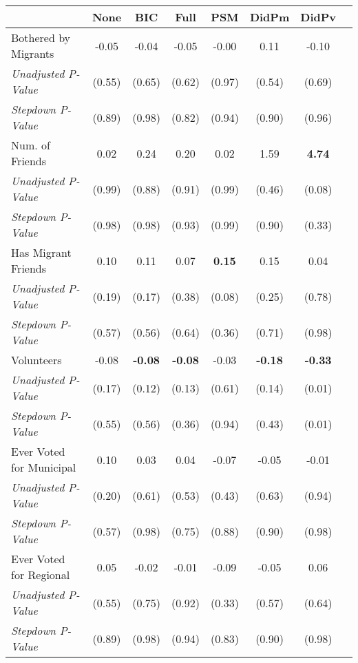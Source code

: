 \begin{tabular}{l c c c c c c c}
\toprule
 & None & BIC & Full & PSM & DidPm & DidPv \\
\midrule
Bothered by Migrants & -0.05 & -0.04 & -0.05 & -0.00 & 0.11 & -0.10 \\
\quad \textit{Unadjusted P-Value} & (0.55) & (0.65) & (0.62) & (0.97) & (0.54) & (0.69) \\
\quad \textit{Stepdown P-Value} & (0.89) & (0.98) & (0.82) & (0.94) & (0.90) & (0.96) \\
Num. of Friends & 0.02 & 0.24 & 0.20 & 0.02 & 1.59 & \textbf{ 4.74 } \\
\quad \textit{Unadjusted P-Value} & (0.99) & (0.88) & (0.91) & (0.99) & (0.46) & (0.08) \\
\quad \textit{Stepdown P-Value} & (0.98) & (0.98) & (0.93) & (0.99) & (0.90) & (0.33) \\
Has Migrant Friends & 0.10 & 0.11 & 0.07 & \textbf{ 0.15 } & 0.15 & 0.04 \\
\quad \textit{Unadjusted P-Value} & (0.19) & (0.17) & (0.38) & (0.08) & (0.25) & (0.78) \\
\quad \textit{Stepdown P-Value} & (0.57) & (0.56) & (0.64) & (0.36) & (0.71) & (0.98) \\
Volunteers & -0.08 & \textbf{ -0.08 } & \textbf{ -0.08 } & -0.03 & \textbf{ -0.18 } & \textbf{ -0.33 } \\
\quad \textit{Unadjusted P-Value} & (0.17) & (0.12) & (0.13) & (0.61) & (0.14) & (0.01) \\
\quad \textit{Stepdown P-Value} & (0.55) & (0.56) & (0.36) & (0.94) & (0.43) & (0.01) \\
Ever Voted for Municipal & 0.10 & 0.03 & 0.04 & -0.07 & -0.05 & -0.01 \\
\quad \textit{Unadjusted P-Value} & (0.20) & (0.61) & (0.53) & (0.43) & (0.63) & (0.94) \\
\quad \textit{Stepdown P-Value} & (0.57) & (0.98) & (0.75) & (0.88) & (0.90) & (0.98) \\
Ever Voted for Regional & 0.05 & -0.02 & -0.01 & -0.09 & -0.05 & 0.06 \\
\quad \textit{Unadjusted P-Value} & (0.55) & (0.75) & (0.92) & (0.33) & (0.57) & (0.64) \\
\quad \textit{Stepdown P-Value} & (0.89) & (0.98) & (0.94) & (0.83) & (0.90) & (0.98) \\
\bottomrule
\end{tabular}

